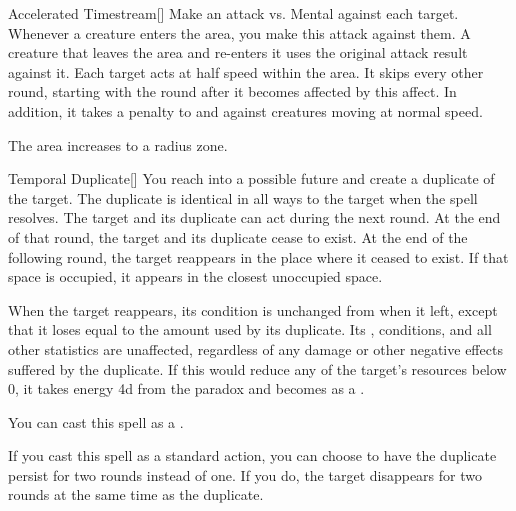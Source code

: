 \lowercase{\hypertarget{spell:Accelerated Timestream}{}}\label{spell:Accelerated Timestream}
\begin{freeability}[Rank 5]{\hypertarget{spell:Accelerated Timestream}{Accelerated Timestream}}[]
Make an attack vs. Mental against each target.
Whenever a creature enters the area, you make this attack against them.
A creature that leaves the area and re-enters it uses the original attack result against it.
\hit Each target acts at half speed within the area.
It skips every other round, starting with the round after it becomes affected by this affect.
In addition, it takes a  penalty to  and  against creatures moving at normal speed.

\rankline
{} The area increases to a \arealarge radius zone.
\end{freeability}
\vspace{0.25em}



\lowercase{\hypertarget{spell:Temporal Duplicate}{}}\label{spell:Temporal Duplicate}
\begin{freeability}[Rank 5]{\hypertarget{spell:Temporal Duplicate}{Temporal Duplicate}}[]
You reach into a possible future and create a duplicate of the target.
The duplicate is identical in all ways to the target when the spell resolves.
The target and its duplicate can act during the next round.
At the end of that round, the target and its duplicate cease to exist.
At the end of the following round, the target reappears in the place where it ceased to exist.
If that space is occupied, it appears in the closest unoccupied space.

When the target reappears, its condition is unchanged from when it left, except that it loses  equal to the amount used by its duplicate.
Its , conditions, and all other statistics are unaffected, regardless of any damage or other negative effects suffered by the duplicate.
If this would reduce any of the target's resources below 0, it takes energy  \plus4d from the paradox and becomes  as a .

You can cast this spell as a .

\rankline
{} If you cast this spell as a standard action, you can choose to have the duplicate persist for two rounds instead of one.
If you do, the target disappears for two rounds at the same time as the duplicate.
\end{freeability}
\vspace{0.25em}




